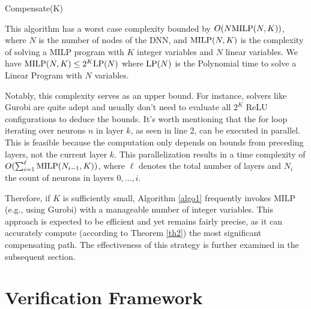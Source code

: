 \begin{algorithm}[htb]
	\caption{Compensate(K)}
	\label{algo1}
	
	
\end{algorithm}	




This algorithm has a worst case complexity bounded by $O(N {\textrm{MILP}}(N,K))$, 
where $N$ is the number of nodes of the DNN, 
and ${\textrm{MILP}}(N,K)$ is the complexity of solving a MILP program with $K$ integer variables and $N$ linear variables.
We have ${\textrm{MILP}}(N,K) \leq 2^K {\textrm{LP}}(N)$ where ${\textrm{LP}}(N)$ is the Polynomial time to solve a Linear Program with $N$ variables.

Notably, this complexity serves as an upper bound. For instance, solvers like Gurobi are quite adept and usually don't need to evaluate all $2^K$ ReLU configurations to deduce the bounds.
It's worth mentioning that the for loop iterating over neurons $n$ in layer $k$, as seen in line 2, can be executed in parallel. This is feasible because the computation only depends on bounds from preceding layers, not the current layer $k$. This parallelization results in a time complexity of $O(\sum_{i=1}^{\ell} {\textrm{MILP}}(N_{i-1},K))$, where $\ell$ denotes the total number of layers and $N_i$ the count of neurons in layers $0, ..., i$.


Therefore, if $K$ is sufficiently small, Algorithm \ref{algo1} frequently invokes MILP (e.g., using Gurobi) with a manageable number of integer variables. This approach is expected to be efficient and yet remains fairly precise, as it can accurately compute (according to Theorem \ref{th2}) the most significant compensating path. The effectiveness of this strategy is further examined in the subsequent section.



\iffalse
\section{Verification Framework}




